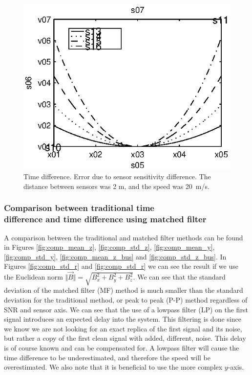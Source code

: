 \begin{figure}[!thbf]
  \centering
  \begin{minipage}{0.45\linewidth}
  \centering
  
   \includegraphics[width=\linewidth]{images/vest_eps}
  \caption[Time difference. Error due to sensor sensitivity difference]{Time difference. Error due to sensor sensitivity difference. The distance between sensors was 2 m, and the speed was 20~m/s.}
  \label{fig:vest_eps}
  \end{minipage}
\end{figure}

\subsubsection[Comparison between traditional time difference and time difference using matched filter]{Comparison between traditional time\\difference and time difference using matched filter}

A comparison between the traditional and matched filter methods can be found in Figures \ref{fig:comp_mean_z}, \ref{fig:comp_std_z}, \ref{fig:comp_mean_y}, \ref{fig:comp_std_y}, \ref{fig:comp_mean_z_bus} and \ref{fig:comp_std_z_bus}. In Figures \ref{fig:comp_std_r} and \ref{fig:comp_std_r} we can see the result if we use the Euclidean norm $\Vert \vec{B} \Vert= \sqrt{B_x^2+B_y^2+B_z^2}$. We can see that the standard deviation of the matched filter (MF) method is much smaller than the standard deviation for the traditional method, or peak to peak (P-P) method regardless of SNR and sensor axis. We can see that the use of a lowpass filter (LP) on the first signal introduces an expected delay into the system. This filtering is done since we know we are not looking for an exact replica of the first signal and its noise, but rather a copy of the first clean signal with added, different, noise. This delay is of course known and can be compensated for. A lowpass filter will cause the time difference to be underestimated, and therefore the speed will be overestimated. We also note that it is beneficial to use the more complex $y$-axis.


